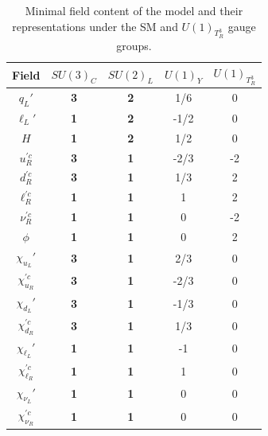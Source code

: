 \begin{table}[h]
    \centering
    \begin{tabular}{ccccc}
    \hline
    \hline
        Field & $SU(3)_C$  & $SU(2)_L$ & $U(1)_Y$ & $U(1)_{T^3_R}$ \\
    \hline\hline
        $q_L'$                    & \bf{3} & \bf{2} & 1/6 & 0\\
        $\ell_L'$                 & \bf{1} & \bf{2} & -1/2 & 0\\
        $H$                         & \bf{1} & \bf{2} & 1/2 & 0\\
        \hline
        $u_R^{\prime c}$          & \bf{3} & \bf{1} & -2/3 & -2\\
        $d_R^{\prime c}$          & \bf{3} & \bf{1} & 1/3 & 2\\
        $\ell_R^{\prime c}$       & \bf{1} & \bf{1} & 1 & 2\\
        $\nu_R^{\prime c}$        & \bf{1} & \bf{1} & 0 & -2\\
        $\phi$                      & \bf{1} & \bf{1} & 0 & 2\\
        \hline
        $\chi_{u_L}'$               & \bf{3} & \bf{1} & 2/3 & 0\\
        $\chi_{u_R}^{\prime c}$     & \bf{3} & \bf{1} & -2/3 & 0\\
        $\chi_{d_L}'$               & \bf{3} & \bf{1} & -1/3 & 0\\
        $\chi_{d_R}^{\prime c}$     & \bf{3} & \bf{1} & 1/3 & 0\\
        $\chi_{\ell_L}'$            & \bf{1} & \bf{1} & -1 & 0\\
        $\chi_{\ell_R}^{\prime c}$  & \bf{1} & \bf{1} & 1 & 0\\
        $\chi_{\nu_L}'$             & \bf{1} & \bf{1} & 0 & 0\\
        $\chi_{\nu_R}^{\prime c}$   & \bf{1} & \bf{1} & 0 & 0\\
    \hline
    \hline
    \end{tabular}
    \caption{Minimal field content of the model and their representations under the SM and $U(1)_{T^3_R}$ gauge groups.}
    \label{tab:QMnumbers}
\end{table}

